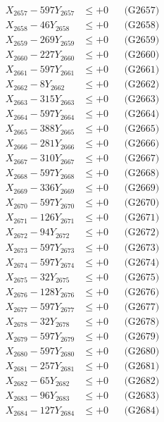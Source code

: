 \documentclass[a4paper,10pt]{article}
\begin{document}
{\begin{align}
X_{2657} - 597Y_{2657} &\leq +0 && \text{(G2657)} \\
X_{2658} - 46Y_{2658} &\leq +0 && \text{(G2658)} \\
X_{2659} - 269Y_{2659} &\leq +0 && \text{(G2659)} \\
X_{2660} - 227Y_{2660} &\leq +0 && \text{(G2660)} \\
\allowbreak
X_{2661} - 597Y_{2661} &\leq +0 && \text{(G2661)} \\
X_{2662} - 8Y_{2662} &\leq +0 && \text{(G2662)} \\
X_{2663} - 315Y_{2663} &\leq +0 && \text{(G2663)} \\
X_{2664} - 597Y_{2664} &\leq +0 && \text{(G2664)} \\
X_{2665} - 388Y_{2665} &\leq +0 && \text{(G2665)} \\
X_{2666} - 281Y_{2666} &\leq +0 && \text{(G2666)} \\
X_{2667} - 310Y_{2667} &\leq +0 && \text{(G2667)} \\
X_{2668} - 597Y_{2668} &\leq +0 && \text{(G2668)} \\
X_{2669} - 336Y_{2669} &\leq +0 && \text{(G2669)} \\
X_{2670} - 597Y_{2670} &\leq +0 && \text{(G2670)} \\
\allowbreak
X_{2671} - 126Y_{2671} &\leq +0 && \text{(G2671)} \\
X_{2672} - 94Y_{2672} &\leq +0 && \text{(G2672)} \\
X_{2673} - 597Y_{2673} &\leq +0 && \text{(G2673)} \\
X_{2674} - 597Y_{2674} &\leq +0 && \text{(G2674)} \\
X_{2675} - 32Y_{2675} &\leq +0 && \text{(G2675)} \\
X_{2676} - 128Y_{2676} &\leq +0 && \text{(G2676)} \\
X_{2677} - 597Y_{2677} &\leq +0 && \text{(G2677)} \\
X_{2678} - 32Y_{2678} &\leq +0 && \text{(G2678)} \\
X_{2679} - 597Y_{2679} &\leq +0 && \text{(G2679)} \\
X_{2680} - 597Y_{2680} &\leq +0 && \text{(G2680)} \\
\allowbreak
X_{2681} - 257Y_{2681} &\leq +0 && \text{(G2681)} \\
X_{2682} - 65Y_{2682} &\leq +0 && \text{(G2682)} \\
X_{2683} - 96Y_{2683} &\leq +0 && \text{(G2683)} \\
X_{2684} - 127Y_{2684} &\leq +0 && \text{(G2684)} \\

\end{align}}
\end{document}

